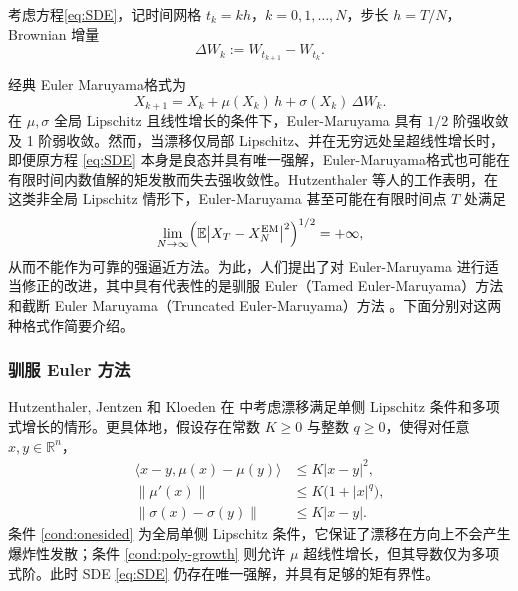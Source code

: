 	
	考虑方程\eqref{eq:SDE}，记时间网格 $t_k = k h$，$k=0,1,\dots,N$，步长 $h=T/N$，Brownian 增量
	\[
	\Delta W_k := W_{t_{k+1}} - W_{t_k}.
	\]
	
	经典 Euler Maruyama格式为
	\[
	X_{k+1} = X_k + \mu(X_k)\,h + \sigma(X_k)\,\Delta W_k.
	\]
	在 $\mu,\sigma$ 全局 Lipschitz 且线性增长的条件下，Euler-Maruyama 具有 $1/2$ 阶强收敛及 1 阶弱收敛。然而，当漂移仅局部 Lipschitz、并在无穷远处呈超线性增长时，即便原方程 \eqref{eq:SDE} 本身是良态并具有唯一强解，Euler-Maruyama格式也可能在有限时间内数值解的矩发散而失去强收敛性。Hutzenthaler 等人的工作表明，在这类非全局 Lipschitz 情形下，Euler-Maruyama 甚至可能在有限时间点 $T$ 处满足
	\[
	\lim_{N\to\infty}
	\Bigl(\mathbb{E}\bigl|X_T - X^{\mathrm{EM}}_N\bigr|^2\Bigr)^{1/2} = +\infty,
	\]
	从而不能作为可靠的强逼近方法。为此，人们提出了对 Euler-Maruyama 进行适当修正的改进，其中具有代表性的是驯服 Euler（Tamed Euler-Maruyama）方法 \cite{hutzenthaler2012strong} 和截断 Euler Maruyama（Truncated Euler-Maruyama）方法 \cite{mao2015truncated}。下面分别对这两种格式作简要介绍。
	
	\subsubsection{驯服 Euler 方法}
	
	Hutzenthaler, Jentzen 和 Kloeden 在 \cite{hutzenthaler2012strong} 中考虑漂移满足单侧 Lipschitz 条件和多项式增长的情形。更具体地，假设存在常数 $K\ge0$ 与整数 $q\ge0$，使得对任意 $x,y\in\mathbb{R}^n$，
	\begin{align}
		\langle x-y,\mu(x)-\mu(y)\rangle &\le K|x-y|^2, \label{cond:onesided}\\
		\|\mu'(x)\| &\le K\bigl(1+|x|^q\bigr), \label{cond:poly-growth}\\
		\|\sigma(x)-\sigma(y)\| &\le K|x-y|.
	\end{align}
	条件 \eqref{cond:onesided} 为全局单侧 Lipschitz 条件，它保证了漂移在方向上不会产生爆炸性发散；条件 \eqref{cond:poly-growth} 则允许 $\mu$ 超线性增长，但其导数仅为多项式阶。此时 SDE \eqref{eq:SDE} 仍存在唯一强解，并具有足够的矩有界性。
	
